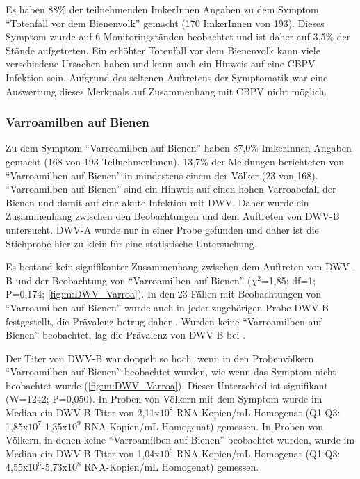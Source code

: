 Es haben 88\% der teilnehmenden ImkerInnen Angaben zu dem Symptom \enquote{Totenfall vor dem Bienenvolk} gemacht (170 ImkerInnen von 193). Dieses Symptom wurde auf 6 Monitoringständen beobachtet und ist daher auf 3,5\% der Stände aufgetreten. Ein erhöhter Totenfall vor dem Bienenvolk kann viele verschiedene Ursachen haben und kann auch ein Hinweis auf eine CBPV Infektion sein. Aufgrund des seltenen Auftretens der Symptomatik war eine Auswertung dieses Merkmals auf Zusammenhang mit CBPV nicht möglich.

\subsubsection{Varroamilben auf Bienen}

Zu dem Symptom \enquote{Varroamilben auf Bienen} haben 87,0\% ImkerInnen Angaben gemacht (168 von 193 TeilnehmerInnen). 13,7\% der Meldungen berichteten von \enquote{Varroamilben auf Bienen} in mindestens einem der Völker (23 von 168). \enquote{Varroamilben auf Bienen} sind ein Hinweis auf einen hohen Varroabefall der Bienen und damit auf eine akute Infektion mit DWV. Daher wurde ein Zusammenhang zwischen den Beobachtungen und dem Auftreten von DWV-B untersucht. DWV-A wurde nur in einer Probe gefunden und daher ist die Stichprobe hier zu klein für eine statistische Untersuchung.

Es bestand kein signifikanter Zusammenhang zwischen dem Auftreten von DWV-B und der Beobachtung von \enquote{Varroamilben auf Bienen} ($\chi^2$=1,85; df=1; P=0,174; \cref{fig:m:DWV_Varroa}). In den 23 Fällen mit Beobachtungen von \enquote{Varroamilben auf Bienen} wurde auch in jeder zugehörigen Probe DWV-B festgestellt, die Prävalenz betrug daher . Wurden keine \enquote{Varroamilben auf Bienen} beobachtet, lag die Prävalenz von DWV-B bei .

Der Titer von DWV-B war doppelt so hoch, wenn in den Probenvölkern \enquote{Varroamilben auf Bienen} beobachtet wurden, wie wenn das Symptom nicht beobachtet wurde (\cref{fig:m:DWV_Varroa}). Dieser Unterschied ist signifikant (W=1242; P=0,050). In Proben von Völkern mit dem Symptom wurde im Median ein DWV-B Titer von 2,11x$10^8$ RNA-Kopien/\si{\milli\liter} Homogenat (Q1-Q3: 1,85x$10^7$-1,35x$10^9$ RNA-Kopien/\si{\milli\liter} Homogenat) gemessen. In Proben von Völkern, in denen keine \enquote{Varroamilben auf Bienen} beobachtet wurden, wurde im Median ein DWV-B Titer von 1,04x$10^8$ RNA-Kopien/\si{\milli\liter} Homogenat (Q1-Q3: 4,55x$10^6$-5,73x$10^8$ RNA-Kopien/\si{\milli\liter} Homogenat) gemessen.


